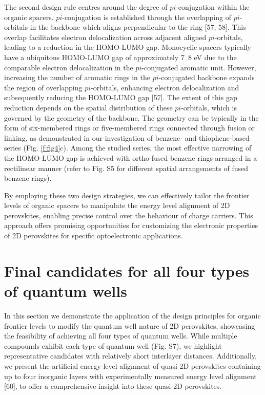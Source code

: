The second design rule centres around the degree of $pi$-conjugation within the organic spacers. $pi$-conjugation is established through the overlapping of $pi$-orbitals in the backbone which aligns perpendicular to the ring [57, 58]. This overlap facilitates electron delocalization across adjacent aligned $pi$-orbitals, leading to a reduction in the HOMO-LUMO gap. Monocyclic spacers typically have a ubiquitous HOMO-LUMO gap of approximately 7~8 eV due to the comparable electron delocalization in the $pi$-conjugated aromatic unit. However, increasing the number of aromatic rings in the $pi$-conjugated backbone expands the region of overlapping $pi$-orbitals, enhancing electron delocalization and subsequently reducing the HOMO-LUMO gap [57]. The extent of this gap reduction depends on the spatial distribution of these $pi$-orbitals, which is governed by the geometry of the backbone. The geometry can be typically in the form of six-membered rings or five-membered rings connected through fusion or linking, as demonstrated in our investigation of benzene- and thiophene-based series (Fig. \ref{f:fig4}c). Among the studied series, the most effective narrowing of the HOMO-LUMO gap is achieved with ortho-fused benzene rings arranged in a rectilinear manner (refer to Fig. S5 for different spatial arrangements of fused benzene rings).

By employing these two design strategies, we can effectively tailor the frontier levels of organic spacers to manipulate the energy level alignment of 2D perovskites, enabling precise control over the behaviour of charge carriers. This approach offers promising opportunities for customizing the electronic properties of 2D perovskites for specific optoelectronic applications.

\section{Final candidates for all four types of quantum wells}

In this section we demonstrate the application of the design principles for organic frontier levels to modify the quantum well nature of 2D perovskites, showcasing the feasibility of achieving all four types of quantum wells. While multiple compounds exhibit each type of quantum well (Fig. S7), we highlight representative candidates with relatively short interlayer distances. Additionally, we present the artificial energy level alignment of quasi-2D perovskites containing up to four inorganic layers with experimentally measured energy level alignment [60], to offer a comprehensive insight into these quasi-2D perovskites.


